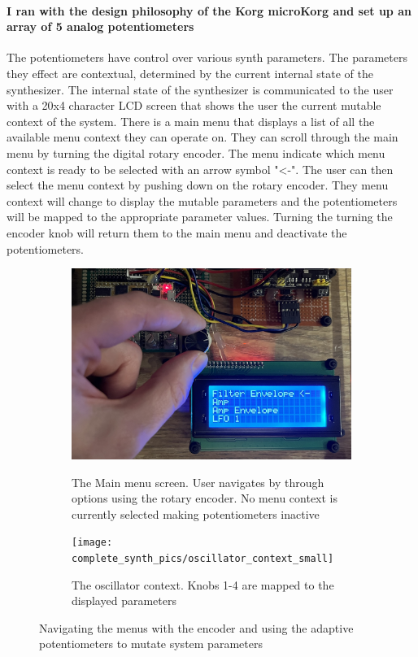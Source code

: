 \documentclass[acmlarge,screen]{acmart}
\begin{document}
	\paragraph{I ran with the design philosophy of the Korg microKorg and set up an array of 5 analog potentiometers} The potentiometers have control over various synth parameters. The parameters they effect are contextual, determined by the current internal state of the synthesizer. The internal state of the synthesizer is communicated to the user with a 20x4 character LCD screen that shows the user the current mutable context of the system. There is a main menu that displays a list of all the available menu context they can operate on. They can scroll through the main menu by turning the digital rotary encoder. The menu indicate which menu context is ready to be selected with an arrow symbol "<-". The user can then select the menu context by pushing down on the rotary encoder. They menu context will change to display the mutable parameters and the potentiometers will be mapped to the appropriate parameter values. Turning the turning the encoder knob will return them to the main menu and deactivate the potentiometers.


	\begin{figure}[H]
		\centering
		\begin{subfigure}{.5\textwidth}
			\centering
			\caption{The Main menu screen. User navigates by through options using the rotary encoder. No menu context is currently selected making potentiometers inactive}
			\includegraphics[width=.9\linewidth]{complete_synth_pics/menu_navigation}
			\label{fig:sub1}
		\end{subfigure}%
		\begin{subfigure}{.5\textwidth}
			\centering
			\caption{The oscillator context. Knobs 1-4 are mapped to the displayed parameters}
			\texttt{[image: complete\_synth\_pics/oscillator\_context\_small]}
			\label{fig:sub2}
		\end{subfigure}
		\caption{Navigating the menus with the encoder and using the adaptive potentiometers to mutate system parameters}
		\label{fig:test}
	\end{figure}	
\end{document}
